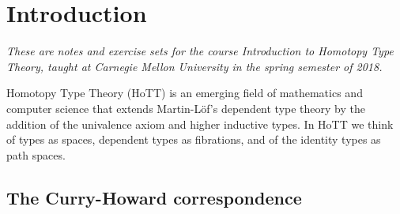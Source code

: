 \chapter{Introduction}

\emph{These are notes and exercise sets for the course Introduction to Homotopy Type Theory, taught at Carnegie Mellon University in the spring semester of 2018.} 

\bigskip
\noindent Homotopy Type Theory (HoTT) is an emerging field of mathematics and computer science that extends Martin-Löf's dependent type theory by the addition of the univalence axiom and higher inductive types. In HoTT we think of types as spaces, dependent types as fibrations, and of the identity types as path spaces.



\section{The Curry-Howard correspondence}



